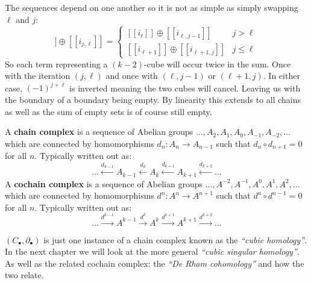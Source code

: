 The sequences depend on one another so it is not as simple as simply swapping $\ell$ and $j$:
\begin{equation}
   [\![i_j]\!] \oplus [\![i_{j,\ell}]\!] =
     \begin{cases}
       [\![i_\ell]\!] \oplus [\![i_{\ell,j-1}]\!] & j > \ell \\
       [\![i_{\ell+1}]\!] \oplus [\![i_{\ell+1,j}]\!] & j \leq \ell
     \end{cases}
\end{equation}
So each term representing a $(k-2)$-cube will occur twice in the sum.
Once with the iteration $(j,\ell)$ and once with $(\ell, j-1)$ or $(\ell+1, j)$.
In either case, $(-1)^{j+\ell}$ is inverted meaning the two cubes will cancel.
Leaving us with the boundary of a boundary being empty.
By linearity this extends to all chains as well as the sum of empty sets is of course still empty.


\begin{definition}
	A \textbf{chain complex} is a sequence of Abelian groups $\ldots, A_2, A_1, A_0, A_{-1}, A_{-2}, \ldots$ \linebreak
	which are connected by homomorphisms $d_n:A_n \to A_{n-1}$ such that $d_n \circ d_{n+1} = 0$ for all $n$.
	Typically written out as:
	\begin{equation}
		\ldots 	\xleftarrow{d_{k-1}} A_{k-1} 
				\xleftarrow{d_{k}} A_k 
				\xleftarrow{d_{k+1}} A_{k+1} 
				\xleftarrow{d_{k+2}} \ldots
	\end{equation}
	A \textbf{cochain complex} is a sequence of Abelian groups $\ldots, A^{-2}, A^{-1}, A^0, A^{1}, A^{2}, \ldots$
	which are connected by homomorphisms $d^n:A^n \to A^{n+1}$ such that $d^n \circ d^{n-1} = 0$ for all $n$.
	Typically written out as:
	\begin{equation}
		\ldots 	\xrightarrow{d^{k-1}} A^{k-1} 
				\xrightarrow{d^{k}} A^k 
				\xrightarrow{d^{k+1}} A^{k+1} 
				\xrightarrow{d^{k+2}} \ldots
	\end{equation}
\end{definition}

$(C_\bullet, \partial_\bullet)$ is just one instance of a chain complex known as the \emph{``cubic homology''}.
In the next chapter we will look at the more general \emph{``cubic singular homology''}.
As well as the related cochain complex: the \emph{``De Rham cohomology''} and how the two relate.










